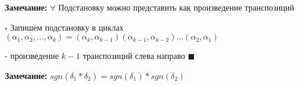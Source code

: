 \documentclass[a4paper,12pt]{article}
\begin{document}
	{\bf Замечание: } $\forall$ Подстановку можно представить как произведение транспозиций

	$\square$ Запишем подстановку в циклах $(\alpha_1, \alpha_2, \ldots, \alpha_k)= (\alpha_k, \alpha_{k-1})(\alpha_{k-1}, \alpha_{k-2})\ldots(\alpha_2, \alpha_1)$

	- произведение $k-1$ транспозиций слева направо
	$\blacksquare$

	{\bf Замечание: } $sgn(\delta_1 * \delta_2)=sgn(\delta_1) * sgn(\delta_2)$
\end{document}
